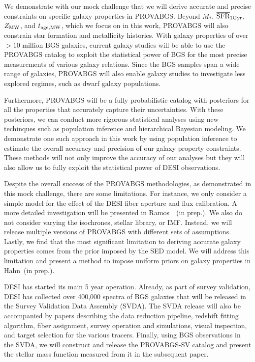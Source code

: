 We demonstrate with our mock challenge that we will derive accurate and precise
constraints on specific galaxy properties in PROVABGS. 
Beyond $M_*$, $\overline{\rm SFR}_{\rm 1Gyr}$, $Z_{\rm MW}$, and $t_{\rm age, MW}$, which we focus on in this work, 
PROVABGS will also constrain star formation and metallicity histories. 
With galaxy properties of over ${>}10$ million BGS galaxies, current galaxy
studies will be able to use the PROVABGS catalog to exploit the statistical
power of BGS for the most precise measurements of various galaxy relations.
Since the BGS samples span a wide range of galaxies, PROVABGS will
also enable galaxy studies to investigate less explored regimes, such as dwarf
galaxy populations. 

Furthermore, PROVABGS will be a fully probabilistic catalog with posteriors for all the
properties that accurately capture their uncertainties.
With these posteriors, we can conduct more rigorous statistical analyses
using new techinques such as population inference and hierarchical Bayesian
modeling.
We demonstrate one such approach in this work by using population inference to
estimate the overall accuracy and precision of our galaxy property constraints. 
These methods will not only improve the accuracy of our analyses but they will
also allow us to fully exploit the statistical power of DESI observations. 

Despite the overall success of the PROVABGS methodologies, as demonstrated in
this mock challenge, there are some limitations. 
For instance, we only consider a simple model for the effect of the DESI fiber
aperture and flux calibration. 
A more detailed investigation will be presented in Ramos~\etal~(in prep.). 
We also do not consider varying the isochrones, stellar library, or IMF. 
Instead, we will release multiple versions of PROVABGS with different sets of
assumptions. 
Lastly, we find that the most significant limitation to deriving accurate
galaxy properties comes from the prior imposed by the SED model. 
We will address this limitation and present a method to impose uniform priors
on galaxy properties in Hahn~(in prep.). 

DESI has started its main 5 year operation. 
Already, as part of survey validation, DESI has collected over 400,000 spectra
of BGS galaxies that will be released in the Survey Validation Data Assembly
(SVDA). 
The SVDA release will also be accompanied by papers describing the data
reduction pipeline, redshift fitting algorithm, fiber assignment, survey
operation and simulations, visual inspection, and target selection for the
various tracers. 
Finally, using BGS observations in the SVDA, we will construct and release the
PROVABGS-SV catalog and present the stellar mass function measured from it in
the subsequent paper. 


